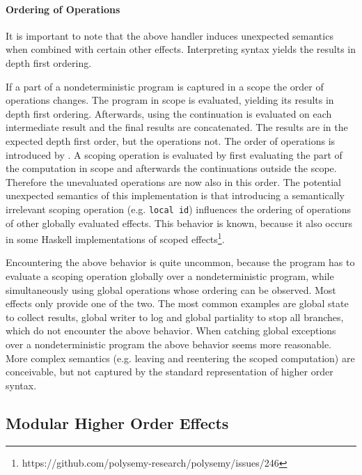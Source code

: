 \paragraph{Ordering of Operations}
It is important to note that the above handler induces unexpected semantics when
combined with certain other effects.
Interpreting  syntax yields the results in depth first
ordering.

If a part of a nondeterministic program is captured in a scope the order of
operations changes.
The program in scope is evaluated, yielding its results in depth first ordering.
Afterwards, using  the continuation is evaluated on each
intermediate result and the final results are concatenated.
The results are in the expected depth first order, but the operations not.
The order of operations is introduced by \AgdaFunction{>>=}.
A scoping operation is evaluated by first evaluating the part of the computation
in scope and afterwards the continuations outside the scope.
Therefore the unevaluated operations are now also in this order.
The potential unexpected semantics of this implementation is that introducing a
semantically irrelevant scoping operation (e.g. \texttt{local id}) influences
the ordering of operations of other globally evaluated effects.
This behavior is known, because it also occurs in some Haskell implementations
of scoped
effects\footnote{https://github.com/polysemy-research/polysemy/issues/246}.

Encountering the above behavior is quite uncommon, because the program has to
evaluate a scoping operation globally over a nondeterministic program, while
simultaneously using global operations whose ordering can be observed.
Most effects only provide one of the two.
The most common examples are global state to collect results, global writer to
log and global partiality to stop all branches, which do not encounter the above
behavior.
When catching global exceptions over a nondeterministic program the above
behavior seems more reasonable.
More complex semantics (e.g. leaving and reentering the scoped computation) are
conceivable, but not captured by the standard representation of higher order
syntax.


\subsection{Modular Higher Order Effects}

